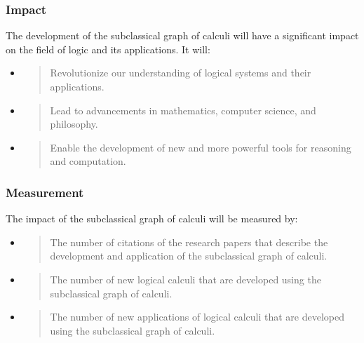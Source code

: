 \hypertarget{impact-1}{%
\subsubsection{Impact}\label{impact-1}}

The development of the subclassical graph of calculi will have a
significant impact on the field of logic and its applications. It will:

\begin{itemize}
\item
  \begin{quote}
  Revolutionize our understanding of logical systems and their
  applications.
  \end{quote}
\item
  \begin{quote}
  Lead to advancements in mathematics, computer science, and philosophy.
  \end{quote}
\item
  \begin{quote}
  Enable the development of new and more powerful tools for reasoning
  and computation.
  \end{quote}
\end{itemize}

\hypertarget{measurement-1}{%
\subsubsection{Measurement}\label{measurement-1}}

The impact of the subclassical graph of calculi will be measured by:

\begin{itemize}
\item
  \begin{quote}
  The number of citations of the research papers that describe the
  development and application of the subclassical graph of calculi.
  \end{quote}
\item
  \begin{quote}
  The number of new logical calculi that are developed using the
  subclassical graph of calculi.
  \end{quote}
\item
  \begin{quote}
  The number of new applications of logical calculi that are developed
  using the subclassical graph of calculi.
  \end{quote}
\end{itemize}

